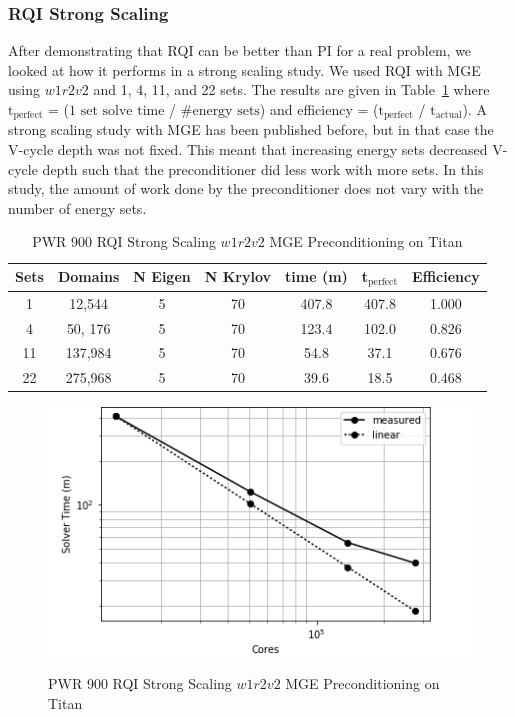 \documentclass{article}                                                                           %
\begin{document}
\subsubsection{RQI Strong Scaling}
After demonstrating that RQI can be better than PI for a real problem, we looked at how it performs in a strong scaling study. 
We used RQI with MGE using $w1r2v2$ and 1, 4, 11, and 22 sets. 
The results are given in Table~\ref{tab:PWR rqi strong scaling} where $\text{t}_{\text{perfect}}$ = ($\text{1 set solve time}$ / $\text{\# energy sets}$) and efficiency = ($\text{t}_{\text{perfect}}$ / $\text{t}_{\text{actual}}$). 
A strong scaling study with MGE has been published before, but in that case the V-cycle depth was not fixed.
This meant that increasing energy sets decreased V-cycle depth such that the preconditioner did less work with more sets. 
In this study, the amount of work done by the preconditioner does not vary with the number of energy sets. 
\begin{table}[!h]
\caption{PWR 900 RQI Strong Scaling $w1r2v2$ MGE Preconditioning on Titan}
  \begin{center}
    \begin{tabular}{| c | c | c | c | c | c | c |}
     \hline
      Sets & Domains & N Eigen & N Krylov & time (m) & t$_{\text{perfect}}$ & Efficiency \\\hline
      1   & 12,544    & 5 & 70 & 407.8 & 407.8 & 1.000 \\
      4   & 50, 176   & 5 & 70 & 123.4 & 102.0 & 0.826\\
      11  & 137,984 & 5 & 70 & 54.8  & 37.1  & 0.676\\
      22  & 275,968 & 5 & 70 & 39.6  & 18.5  & 0.468\\
      \hline
    \end{tabular}
    \label{tab:PWR rqi strong scaling}
  \end{center}
\end{table}
%
\begin{figure}
\caption{PWR 900 RQI Strong Scaling $w1r2v2$ MGE Preconditioning on Titan}
\includegraphics[scale=.75]{./pwr}
\centering
\label{fig:pwr-scaling}
\end{figure}
\end{document}
